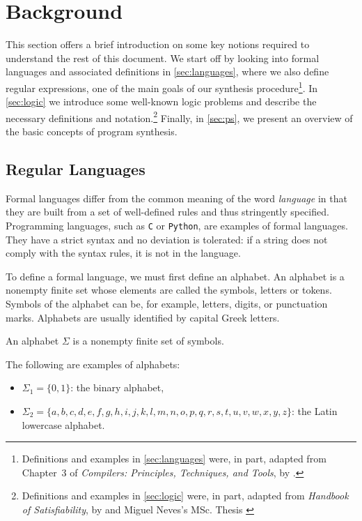 \chapter{Background}\label{chap:background}
This section offers a brief introduction on some key notions required to understand the rest of this document.
%
We start off by looking into formal languages and associated definitions in \autoref{sec:languages}, where we also define regular expressions, one of the main goals of our synthesis procedure\footnote{Definitions and examples in \autoref{sec:languages} were, in part, adapted from Chapter~3 of \textit{Compilers: Principles, Techniques, and Tools}, by \citet*{DragonBook}.}.
%
In \autoref{sec:logic} we introduce some well-known logic problems and describe the necessary definitions and notation.\footnote{Definitions and examples in \autoref{sec:logic}
were, in part, adapted from \textit{Handbook of Satisfiability}, by \citet*{HandbookSAT} and Miguel Neves's MSc. Thesis \cite{MiguelThesis}}
%
Finally, in \autoref{sec:ps}, we present an overview of the basic concepts of program synthesis.

\section{Regular Languages}\label{sec:languages}
Formal languages differ from the common meaning of the word \textit{language} in that they are built from a set of well-defined rules and thus stringently specified. Programming languages, such as \texttt{C} or \texttt{Python}, are examples of formal languages. They have a strict syntax and no deviation is tolerated: if a string does not comply with the syntax rules, it is not in the language.

To define a formal language, we must first define an alphabet.
An alphabet is a nonempty finite set whose elements are called the symbols, letters or tokens.
Symbols of the alphabet can be, for example, letters, digits, or punctuation marks. Alphabets are usually identified by capital Greek letters.

\begin{definition}[Alphabet]
An alphabet \(\Sigma\) is a nonempty finite set of symbols.
\end{definition}

\begin{example}
The following are examples of alphabets:

\begin{itemize}
\item \(\Sigma_1 = \{0,1\}\): the binary alphabet,
\item \(\Sigma_2 = \{a,b,c,d,e,f,g,h,i,j,k,l,m,n,o,p,q,r,s,t,u,v,w,x,y,z\}\): the Latin lowercase alphabet.
\end{itemize}
\end{example}

